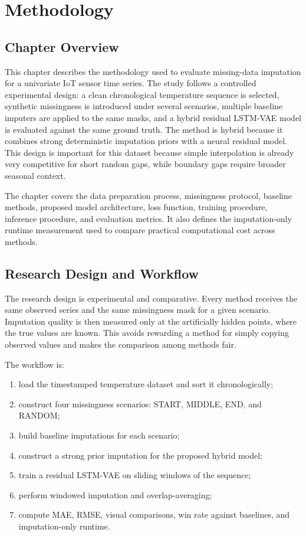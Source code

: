
\chapter{Methodology}
\label{ch:methodology}

\section{Chapter Overview}
This chapter describes the methodology used to evaluate missing-data imputation for a univariate IoT sensor time series. The study follows a controlled experimental design: a clean chronological temperature sequence is selected, synthetic missingness is introduced under several scenarios, multiple baseline imputers are applied to the same masks, and a hybrid residual LSTM-VAE model is evaluated against the same ground truth. The method is hybrid because it combines strong deterministic imputation priors with a neural residual model. This design is important for this dataset because simple interpolation is already very competitive for short random gaps, while boundary gaps require broader seasonal context.

The chapter covers the data preparation process, missingness protocol, baseline methods, proposed model architecture, loss function, training procedure, inference procedure, and evaluation metrics. It also defines the imputation-only runtime measurement used to compare practical computational cost across methods.

\section{Research Design and Workflow}
The research design is experimental and comparative. Every method receives the same observed series and the same missingness mask for a given scenario. Imputation quality is then measured only at the artificially hidden points, where the true values are known. This avoids rewarding a method for simply copying observed values and makes the comparison among methods fair.

The workflow is:
\begin{enumerate}
	\item load the timestamped temperature dataset and sort it chronologically;
	\item construct four missingness scenarios: START, MIDDLE, END, and RANDOM;
	\item build baseline imputations for each scenario;
	\item construct a strong prior imputation for the proposed hybrid model;
	\item train a residual LSTM-VAE on sliding windows of the sequence;
	\item perform windowed imputation and overlap-averaging;
	\item compute MAE, RMSE, visual comparisons, win rate against baselines, and imputation-only runtime.
\end{enumerate}

